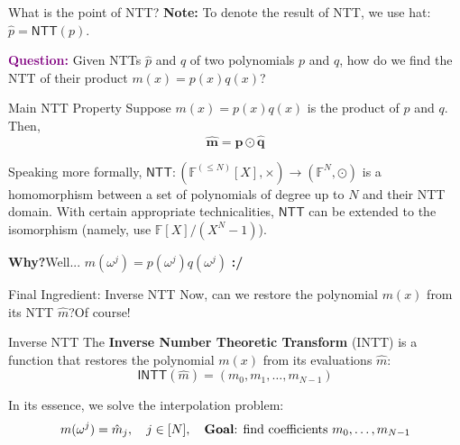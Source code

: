 \documentclass{zkdl-presentation-template}
\begin{document}
    \begin{frame}{What is the point of NTT?}
        \textcolor{green!60!black}{\textbf{Note:}} To denote the result of NTT, we use hat: $\hat{p} = \mathsf{NTT}(p)$.\pause

        \textcolor{purple}{\textbf{Question:}} Given NTTs $\hat{p}$ and $\hat{q}$ of two polynomials $p$ and $q$, 
        how do we find the NTT of their product $m(x) = p(x)q(x)$?\pause

        \begin{block}{Main NTT Property}
            Suppose $m(x) = p(x)q(x)$ is the product of $p$ and $q$. Then,
            \begin{equation*}
                \hat{\boldsymbol{m}} = \hat{\boldsymbol{p}} \odot \hat{\boldsymbol{q}}
            \end{equation*}
        
            \pause Speaking more formally, $\mathsf{NTT}: (\mathbb{F}^{(\leq N)}[X],\times) \to (\mathbb{F}^N, \odot)$ is 
            a homomorphism between a set of polynomials of degree up to $N$ and their NTT domain. With certain 
            appropriate technicalities, $\mathsf{NTT}$ can be extended to the isomorphism (namely, use $\mathbb{F}[X] / (X^N-1)$).
        \end{block}

        \pause\textcolor{blue!60!black}{\textbf{Why?}}\pause Well... $m(\omega^j)=p(\omega^j)q(\omega^j)$ \hspace{20px} \textbf{:/}
    \end{frame}

    \begin{frame}{Final Ingredient: Inverse NTT}
        Now, can we restore the polynomial $m(x)$ from its NTT $\hat{m}$?\pause Of course!

        \begin{definition}{Inverse NTT}
            The \textbf{Inverse Number Theoretic Transform} (INTT) is a function 
            that restores the polynomial $m(x)$ from its evaluations $\hat{m}$:
            \begin{equation*}
                \mathsf{INTT}(\hat{m}) = (m_0,m_1,\dots,m_{N-1})
            \end{equation*}
        \end{definition}

        \pause In its essence, we solve the interpolation problem:
        \begin{equation*}
            m(\omega^j) = \hat{m}_j, \quad j \in [N], \quad \text{\textbf{Goal}: find coefficients $m_0,\dots,m_{N-1}$}
        \end{equation*}
    \end{frame}
\end{document}
